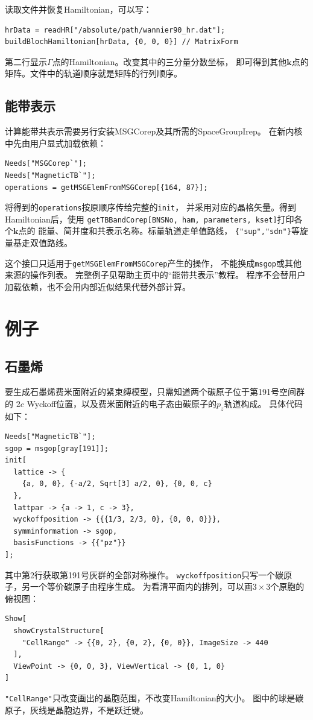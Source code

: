 \documentclass[titlepage,a4paper,12pt,AutoFakeBold]{article}
\begin{document}
读取文件并恢复Hamiltonian，可以写：
\begin{lstlisting}
hrData = readHR["/absolute/path/wannier90_hr.dat"];
buildBlochHamiltonian[hrData, {0, 0, 0}] // MatrixForm
\end{lstlisting}
第二行显示$\Gamma$点的Hamiltonian。改变其中的三分量分数坐标，
即可得到其他$\boldsymbol k$点的矩阵。文件中的轨道顺序就是矩阵的行列顺序。

\subsection{能带表示}
计算能带共表示需要另行安装\textsf{MSGCorep}及其所需的\textsf{SpaceGroupIrep}。
在新内核中先由用户显式加载依赖：
\begin{lstlisting}[numbers=none]
Needs["MSGCorep`"];
Needs["MagneticTB`"];
operations = getMSGElemFromMSGCorep[{164, 87}];
\end{lstlisting}
将得到的\lstinline|operations|按原顺序传给完整的\lstinline|init|，
并采用对应的晶格矢量。得到Hamiltonian后，使用
\lstinline|getTBBandCorep[BNSNo, ham, parameters, kset]|打印各个$\boldsymbol k$点的
能量、简并度和共表示名称。标量轨道走单值路线，
\lstinline|{"sup","sdn"}|等旋量基走双值路线。

这个接口只适用于\lstinline|getMSGElemFromMSGCorep|产生的操作，
不能换成\lstinline|msgop|或其他来源的操作列表。
完整例子见帮助主页中的“能带共表示”教程。
程序不会替用户加载依赖，也不会用内部近似结果代替外部计算。

\section{例子}
\subsection{石墨烯}
\label{gra}
要生成石墨烯费米面附近的紧束缚模型，只需知道两个碳原子位于第191号空间群的
$2c$ Wyckoff位置，以及费米面附近的电子态由碳原子的$p_z$轨道构成。
具体代码如下：
\begin{lstlisting}
Needs["MagneticTB`"];
sgop = msgop[gray[191]];
init[
  lattice -> {
    {a, 0, 0}, {-a/2, Sqrt[3] a/2, 0}, {0, 0, c}
  },
  lattpar -> {a -> 1, c -> 3},
  wyckoffposition -> {{{1/3, 2/3, 0}, {0, 0, 0}}},
  symminformation -> sgop,
  basisFunctions -> {{"pz"}}
];
\end{lstlisting}
其中第2行获取第191号灰群的全部对称操作。
\lstinline|wyckoffposition|只写一个碳原子，另一个等价碳原子由程序生成。
为看清平面内的排列，可以画$3\times3$个原胞的俯视图：
\begin{lstlisting}
Show[
  showCrystalStructure[
    "CellRange" -> {{0, 2}, {0, 2}, {0, 0}}, ImageSize -> 440
  ],
  ViewPoint -> {0, 0, 3}, ViewVertical -> {0, 1, 0}
]
\end{lstlisting}
\lstinline|"CellRange"|只改变画出的晶胞范围，不改变Hamiltonian的大小。
图中的球是碳原子，灰线是晶胞边界，不是跃迁键。
\end{document}
